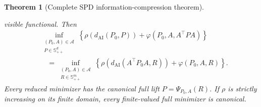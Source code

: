 \documentclass[10pt,a4paper]{amsart}
\newtheorem{theorem}{Theorem}
\newcommand{\AI}{\mathrm{AI}}
\newcommand{\R}{\mathbb R}
\newcommand{\SPD}{\mathbb S_{++}}
\newcommand{\dai}{d_{\AI}}
\begin{document}
\begin{theorem}[Complete SPD information-compression theorem]
\begin{enumerate}[label=(\Alph*),leftmargin=*]
  visible functional.  Then
  \begin{align}
    &\inf_{\substack{(P_0,A)\in\mathcal A\\P\in\SPD^d}}
    \left\{\rho(\dai(P_0,P))+\varphi(P_0,A,A^\top PA)\right\}
    \nonumber\\
    &\quad=
    \inf_{\substack{(P_0,A)\in\mathcal A\\R\in\SPD^m}}
    \left\{\rho(\dai(A^\top P_0A,R))+\varphi(P_0,A,R)\right\}.
    \label{eq:spd-decision-reduction}
  \end{align}
  Every reduced minimizer has the canonical full lift
  \(P=\Psi_{P_0,A}(R)\).  If \(\rho\) is strictly increasing on its finite
  domain, every finite-valued full minimizer is canonical.
\end{enumerate}
\end{theorem}
\end{document}
